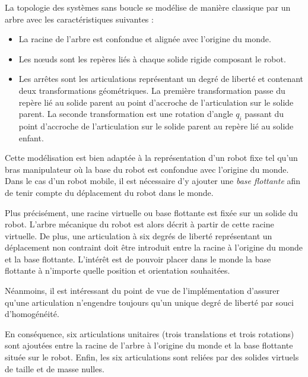 La topologie des systèmes sans boucle se modélise de manière classique 
par un arbre avec les caractéristiques suivantes :
\begin{itemize}
    \item La racine de l'arbre est confondue et alignée avec l'origine du monde.
    \item Les nœuds sont les repères liés à chaque solide rigide composant le robot.
    \item Les arrêtes sont les articulations représentant un degré de liberté et
    contenant deux transformations géométriques. 
    La première transformation passe du repère lié au solide parent au point d'accroche
    de l'articulation sur le solide parent. 
    La seconde transformation est une rotation d'angle $q_i$ passant du point 
    d'accroche de l'articulation sur le solide parent au repère lié au solide enfant.
\end{itemize}

Cette modélisation est bien adaptée à la représentation d'un robot fixe tel
qu'un bras manipulateur où la base du robot est confondue avec l'origine
du monde. 
Dans le cas d'un robot mobile, il est nécessaire d'y ajouter 
une \textit{base flottante} afin de tenir compte du déplacement du robot
dans le monde. 

Plus précisément, une racine virtuelle ou base flottante est fixée
sur un solide du robot. 
L'arbre mécanique du robot est alors décrit à partir de cette racine virtuelle.
De plus, une articulation à six degrés de liberté représentant 
un déplacement non contraint doit être introduit entre 
la racine à l'origine du monde et la base flottante.
L'intérêt est de pouvoir placer dans le monde la base flottante
à n'importe quelle position et orientation souhaitées.

Néanmoins, il est intéressant du point de vue de l'implémentation
d'assurer qu'une articulation n'engendre toujours qu'un unique degré de liberté
par souci d'homogénéité.

En conséquence, six articulations unitaires (trois translations et trois rotations) 
sont ajoutées entre la racine de l'arbre à l'origine du monde et la base flottante
située sur le robot. 
Enfin, les six articulations sont reliées par des solides virtuels de
taille et de masse nulles.

